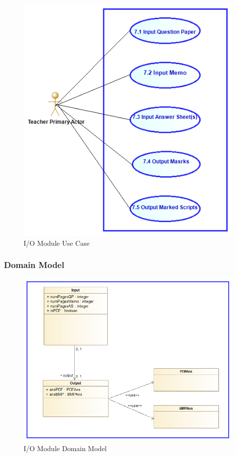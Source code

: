 \documentclass{article}
\begin{document}
				\begin{figure}[h]
			\includegraphics[scale=0.6]{Images/IO_Module/IOModuleUseCase}
			\caption{I/O Module Use Case}
		\end{figure}
		
		\subsubsection{Domain Model}
					\begin{figure}[h]
				\includegraphics[scale=0.6]{Images/IO_Module/IOModuleDomainModel}
				\caption{I/O Module Domain Model}
			\end{figure}
			
\end{document}
